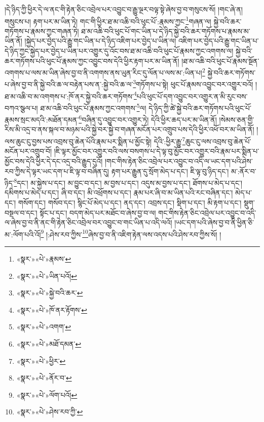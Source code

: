 །དེ་ཉིད་ཀྱི་ཕྱིར་དེ་ལ་ནང་གི་རྟེན་ཅིང་འབྲེལ་པར་འབྱུང་བ་རྒྱུ་ལྔར་བལྟ་སྟེ་ཞེས་བྱ་བ་གསུངས་སོ། །གང་ཞེ་ན། གསུངས་པ། རྟག་པར་མ་ཡིན་ཏེ། གང་གི་ཕྱིར་ཐ་མ་འཆི་བའི་ཕུང་པོ་:རྣམས་ཀྱང་\footnote{«སྣར་»«པེ་»རྣམས་}གཞན་ལ། སྐྱེ་བའི་ཆར་གཏོགས་པ་རྣམས་ཀྱང་གཞན་ཏེ། ཐ་མ་འཆི་བའི་ཕུང་པོ་གང་ཡིན་པ་དེ་ཉིད་སྐྱེ་བའི་ཆར་གཏོགས་པ་རྣམས་མ་ཡིན་ནོ། །སྐྱེད་པར་བྱེད་པའི་རྒྱུ་གང་ཡིན་པ་དེ་ཉིད་འཇིག་པར་བྱེད་པ་ཡིན་ལ། འཇིག་པར་བྱེད་པའི་རྒྱུ་གང་ཡིན་པ་དེ་ཉིད་ཀྱང་སྐྱེད་པར་བྱེད་པ་ཡིན་པར་འགྱུར་དུ་འོང་བས་ཐ་མ་འཆི་བའི་ཕུང་པོ་རྣམས་ཀྱང་འགགས་ལ། སྐྱེ་བའི་ཆར་གཏོགས་པའི་ཕུང་པོ་རྣམས་ཀྱང་འབྱུང་བས་དེའི་ཕྱིར་རྟག་པར་མ་ཡིན་ནོ། །ཐ་མ་འཆི་བའི་ཕུང་པོ་རྣམས་སྔོན་འགགས་པ་ལས་མ་ཡིན་ཞེས་བྱ་བ་ནི་འགགས་ནས་ཡུན་རིང་དུ་ལོན་པ་ལས་མ་:ཡིན་པ།\footnote{«སྣར་»«པེ་»ཡིན་པའོ།} སྐྱེ་བའི་ཆར་གཏོགས་པ་ཞེས་བྱ་བ་ནི་སྐྱེ་བའི་ཆ་ལ་བརྟེན་པས་ན་:སྐྱེ་བའི་ཆ་ལ་\footnote{«སྣར་»«པེ་»སྐྱེ་བའི་ཆར་}གཏོགས་པ་སྟེ། ཕུང་པོ་རྣམས་འབྱུང་བར་འགྱུར་བའོ། །ཐ་མ་འཆི་བ་མ་འགགས་པ་:ཁོ་ནར་སྐྱེ་བའི་ཆར་གཏོགས་\footnote{«སྣར་»«པེ་»ཁོ་ནར་རྟོགས་}པའི་ཕུང་པོ་དག་འབྱུང་བར་འགྱུར་ན་མི་རུང་བས་བཀའ་སྩལ་པ། ཐ་མ་འཆི་བའི་ཕུང་པོ་རྣམས་ཀྱང་འགགས་\footnote{«སྣར་»«པེ་»འགག་}ལ། དེ་ཉིད་ཀྱི་ཚེ་སྐྱེ་བའི་ཆར་གཏོགས་པའི་ཕུང་པོ་རྣམས་སྲང་མདའི་:མཐོན་དམན་\footnote{«སྣར་»«པེ་»མཐོ་དམན་}བཞིན་དུ་འབྱུང་བར་འགྱུར་ཏེ། དེའི་ཕྱིར་ཆད་པར་མ་ཡིན་ནོ། །སེམས་ཅན་གྱི་རིས་མི་འདྲ་བ་ནས་སྐལ་བ་མཉམ་པའི་སྐྱེ་བར་སྐྱེ་བ་གཞན་མངོན་པར་འགྲུབ་པས་དེའི་ཕྱིར་འཕོ་བར་མ་ཡིན་ནོ། །ལས་ཆུང་ངུ་བྱས་པས་འབྲས་བུ་ཆེན་པོའི་རྣམ་པར་སྨིན་པ་མྱོང་སྟེ། དེའི་:ཕྱིར་རྒྱུ་\footnote{«སྣར་»«པེ་»ཕྱིར་}ཆུང་ངུ་ལས་འབྲས་བུ་ཆེན་པོ་མངོན་པར་འགྲུབ་བོ། །ཇི་ལྟར་མྱོང་བར་འགྱུར་བའི་ལས་བསགས་པ་དེ་ལྟ་བུ་མྱོང་བར་འགྱུར་བའི་རྣམ་པར་སྨིན་པ་མྱོང་བས་དེའི་ཕྱིར་དེ་དང་འདྲ་བའི་རྒྱུད་དུའོ། །གང་གིས་རྟེན་ཅིང་འབྲེལ་པར་འབྱུང་བ་འདི་ལ་ཡང་དག་པའི་ཤེས་རབ་ཀྱིས་དེ་ལྟར་ཡང་དག་པ་ཇི་ལྟ་བ་བཞིན་དུ། རྟག་པར་རྒྱུན་དུ་སྲོག་མེད་པ་དང་། ཇི་ལྟ་བུ་ཉིད་དང་། མ་:ནོར་བ་ཉིད་\footnote{«སྣར་»«པེ་»ནོར་བ་}དང་། མ་སྐྱེས་པ་དང་། མ་བྱུང་བ་དང་། མ་བྱས་པ་དང་། འདུས་མ་བྱས་པ་དང་། ཐོགས་པ་མེད་པ་དང་། དམིགས་པ་མེད་པ་དང་། ཞི་བ་དང་། མི་འཕྲོགས་པ་དང་། རྣམ་པར་ཞི་བ་མ་ཡིན་པའི་རང་བཞིན་དང་། མེད་པ་དང་། གསོག་དང་། གསོབ་དང་། སྙིང་པོ་མེད་པ་དང་། ནད་དང་། འབྲས་དང་། སྡིག་པ་དང་། མི་རྟག་པ་དང་། སྡུག་བསྔལ་བ་དང་། སྟོང་པ་དང་། བདག་མེད་པར་མཐོང་བ་ཞེས་བྱ་བ་ལ། གང་གིས་རྟེན་ཅིང་འབྲེལ་པར་འབྱུང་བ་འདི་ལ་ཞེས་བྱ་བ་ནི་ནང་གི་རྟེན་ཅིང་འབྲེལ་བར་འབྱུང་བ་གང་ཡིན་པ་འདི་ལའོ། །ཡང་དག་པའི་ཞེས་བྱ་བ་ནི་ཕྱིན་ཅི་མ་:ལོག་པའི་འོ།\footnote{«སྣར་»«པེ་»ལོག་པའོ།} །:ཤེས་རབ་ཀྱིས་\footnote{«སྣར་»«པེ་»ཤེས་རབ་ཀྱི་}ཞེས་བྱ་བ་ནི་འཇིག་རྟེན་ལས་འདས་པའི་ཤེས་རབ་ཀྱིས་སོ། །

